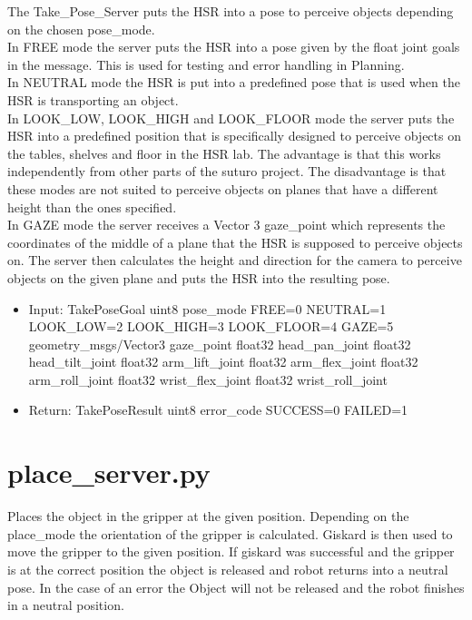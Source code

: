 \documentclass[main.tex]{subfiles}
\begin{document}
			The Take\_Pose\_Server puts the HSR into a pose to perceive objects depending on the chosen pose\_mode. \\
			In FREE mode the server puts the HSR into a pose given by the float joint goals in the message. This is used for testing and error handling in Planning. \\
			In NEUTRAL mode the HSR is put into a predefined pose that is used when the HSR is transporting an object. \\
			In LOOK\_LOW, LOOK\_HIGH and LOOK\_FLOOR mode the server puts the HSR into a predefined position that is specifically designed to perceive objects on the tables, shelves and floor in the HSR lab. The advantage is that this works independently from other parts of the suturo project. The disadvantage is that these modes are not suited to perceive objects on planes that have a different height than the ones specified. \\
			In GAZE mode the server receives a Vector 3 gaze\_point which represents the coordinates of the middle of a plane that the HSR is supposed to perceive objects on. The server then calculates the height and direction for the camera to perceive objects on the given plane and puts the HSR into the resulting pose.
			
			\begin{itemize}
				\item Input: TakePoseGoal 
				\subitem uint8 pose\_mode
				\subsubitem FREE=0
				\subsubitem NEUTRAL=1
				\subsubitem LOOK\_LOW=2
				\subsubitem LOOK\_HIGH=3
				\subsubitem LOOK\_FLOOR=4
				\subsubitem GAZE=5
				\subitem geometry\_msgs/Vector3 gaze\_point
				\subitem float32 head\_pan\_joint
				\subitem float32 head\_tilt\_joint
				\subitem float32 arm\_lift\_joint
				\subitem float32 arm\_flex\_joint
				\subitem float32 arm\_roll\_joint
				\subitem float32 wrist\_flex\_joint
				\subitem float32 wrist\_roll\_joint
				\item Return: TakePoseResult
				\subitem uint8 error\_code 
				\subsubitem SUCCESS=0
				\subsubitem FAILED=1
			\end{itemize}
			
			
			\section{place\_server.py}  
			Places the object in the gripper at the given position. Depending on the place\_mode the orientation of the gripper is calculated. Giskard is then used to move the gripper to the given position. If giskard was successful and the gripper is at the correct position the object is released and robot returns into a neutral pose. In the case of an error the Object will not be released and the robot finishes in a neutral position. 
			
\end{document}
